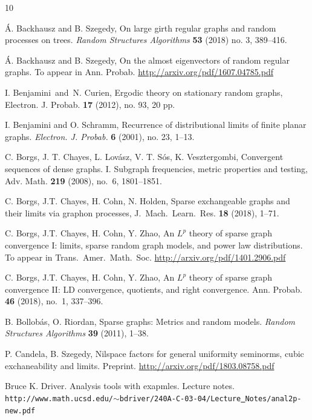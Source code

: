 \documentclass[a4wider]{amsart}
\theoremstyle{definitionbreak}\newtheorem{D}[theorem]{Definition}
\theoremstyle{definitionbreak}\newtheorem*{D*}{Definition}
\begin{document}
\begin{thebibliography}{10}

 \'A. Backhausz and B. Szegedy,  On large girth regular graphs and random processes on trees. {\it Random Structures Algorithms} {\bf 53} (2018) no. 3, 389--416.

 \'A. Backhausz and B. Szegedy, On the almost eigenvectors of random regular graphs. To appear in Ann. Probab. \url{http://arxiv.org/pdf/1607.04785.pdf}

 I. Benjamini\ and\ N. Curien, Ergodic theory on stationary random graphs, Electron. J. Probab. {\bf 17} (2012), no. 93, 20 pp.

  I. Benjamini and O. Schramm, Recurrence of distributional limits of finite
planar graphs. {\it Electron. J. Probab.} {\bf 6} (2001), no. 23, 1--13.

 C. Borgs, J. T. Chayes, L. Lov\'asz, V. T. S\'os, K. Vesztergombi, Convergent sequences of dense graphs. I. Subgraph frequencies, metric properties and testing, Adv. Math. {\bf 219} (2008), no.~6, 1801--1851.

 C. Borgs, J.T. Chayes, H. Cohn, N. Holden,  Sparse exchangeable graphs and their limits via graphon processes, J.\ Mach.\ Learn.\ Res. {\bf 18} (2018), 1--71.

 C. Borgs, J.T. Chayes, H. Cohn, Y. Zhao, An $L^p$ theory of sparse graph convergence I: limits, sparse random graph models, and power law distributions. To appear in Trans.\ Amer.\ Math.\ Soc. 
\url{http://arxiv.org/pdf/1401.2906.pdf}

 C. Borgs, J.T. Chayes, H. Cohn, Y. Zhao,
An $L^p$ theory of sparse graph convergence II: LD convergence, quotients, and right convergence. Ann. Probab. {\bf 46} (2018), no.~1, 337--396. 



 B. Bollob\'as, O. Riordan, Sparse graphs: Metrics and random models. {\it Random Structures Algorithms} {\bf 39} (2011), 1--38.

 P. Candela, B. Szegedy, Nilspace factors for general uniformity seminorms, cubic exchaneability and limits. Preprint. \url{http://arxiv.org/pdf/1803.08758.pdf}

 Bruce K. Driver. Analysis tools with exapmles. Lecture notes.  {\tt http://www.math.ucsd.edu/}$\sim${\tt bdriver/240A-C-03-04/Lecture{\underline\ }Notes/anal2p-new.pdf}


\end{thebibliography}
\end{document}
